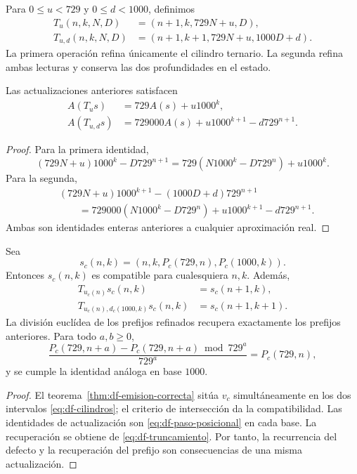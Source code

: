 \begin{definition}
Para \(0\leq u<729\) y \(0\leq d<1000\), definimos
\begin{align*}
 T_u(n,k,N,D)&=(n+1,k,729N+u,D),\\
 T_{u,d}(n,k,N,D)&=(n+1,k+1,729N+u,1000D+d).
\end{align*}
La primera operación refina únicamente el cilindro ternario. La segunda
refina ambas lecturas y conserva las dos profundidades en el estado.
\end{definition}

\begin{proposition}
\label{prop:df-rec-frontera}
Las actualizaciones anteriores satisfacen
\begin{align}
 A(T_u s)&=729A(s)+u1000^k,\label{eq:df-rec-ternaria}\\
 A(T_{u,d}s)&=729000A(s)+u1000^{k+1}-d729^{n+1}.
 \label{eq:df-rec-conjunta}
\end{align}
\end{proposition}

\begin{proof}
Para la primera identidad,
\[
 (729N+u)1000^k-D729^{n+1}
 =729(N1000^k-D729^n)+u1000^k.
\]
Para la segunda,
\begin{align*}
 &(729N+u)1000^{k+1}-(1000D+d)729^{n+1}\\
 &\qquad=729000(N1000^k-D729^n)
      +u1000^{k+1}-d729^{n+1}.
\end{align*}
Ambas son identidades enteras anteriores a cualquier aproximación real.
\end{proof}

\begin{theorem}
\label{thm:df-refinamiento-generado}
Sea
\[
 s_c(n,k)=(n,k,P_c(729,n),P_c(1000,k)).
\]
Entonces \(s_c(n,k)\) es compatible para cualesquiera \(n,k\). Además,
\begin{align*}
 T_{u_c(n)}s_c(n,k)&=s_c(n+1,k),\\
 T_{u_c(n),d_c(1000,k)}s_c(n,k)&=s_c(n+1,k+1).
\end{align*}
La división euclídea de los prefijos refinados recupera exactamente los
prefijos anteriores. Para todo \(a,b\geq0\),
\[
 \frac{P_c(729,n+a)-P_c(729,n+a)\bmod729^a}{729^a}
 =P_c(729,n),
\]
y se cumple la identidad análoga en base \(1000\).
\end{theorem}

\begin{proof}
El teorema~\ref{thm:df-emision-correcta} sitúa \(v_c\) simultáneamente en
los dos intervalos \eqref{eq:df-cilindros}; el criterio de intersección da
la compatibilidad. Las identidades de actualización son
\eqref{eq:df-paso-posicional} en cada base. La recuperación se obtiene de
\eqref{eq:df-truncamiento}. Por tanto, la recurrencia del defecto y la
recuperación del prefijo son consecuencias de una misma actualización.
\end{proof}

